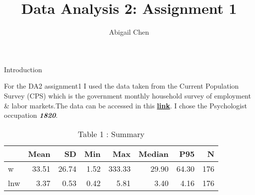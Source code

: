 \documentclass[
]{article}
\title{Data Analysis 2: Assignment 1}
\author{Abigail Chen}
\date{}
\begin{document}
\maketitle

Introduction

For the DA2 assignment1 I used the data taken from the Current
Population Survey (CPS) which is the government monthly household survey
of employment \& labor markets.The data can be accessed in this
\href{https://osf.io/4ay9x/download}{\textbf{link}}. I chose the
Psychologist occupation \emph{\textbf{1820}}.

\begin{table}

\caption{\label{tab:unnamed-chunk-4}Table 1 : Summary}
\centering
\begin{tabular}[t]{lrrrrrrr}
\toprule
  & Mean & SD & Min & Max & Median & P95 & N\\
\midrule
w & \num{33.51} & \num{26.74} & \num{1.52} & \num{333.33} & \num{29.90} & \num{64.30} & 176\\
lnw & \num{3.37} & \num{0.53} & \num{0.42} & \num{5.81} & \num{3.40} & \num{4.16} & 176\\
\bottomrule
\end{tabular}
\end{table}
\end{document}
